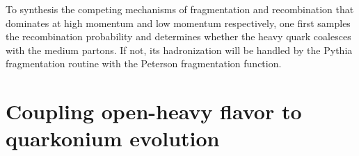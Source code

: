 To synthesis the competing mechanisms of fragmentation and recombination that dominates at high momentum and low momentum respectively, one first samples the recombination probability and determines whether the heavy quark coalesces with the medium partons. 
If not, its hadronization will be handled by the Pythia fragmentation routine with the Peterson fragmentation function.

\section{Coupling open-heavy flavor to quarkonium evolution}
